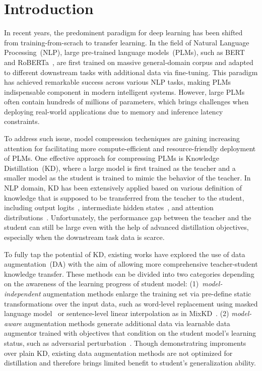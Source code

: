 \section{Introduction}

In recent years, the predominent paradigm for deep learning has been shifted from training-from-scrach to transfer learning. In the field of Natural Language Processing~(NLP), large pre-trained language models~(PLMs), such as BERT~\cite{bert} and RoBERTa~\cite{roberta}, are first trained on massive general-domain corpus and adapted to different downstream tasks with additional data via fine-tuning. This paradigm has achieved remarkable success across various NLP tasks, making PLMs indispensable component in modern intelligent systems. However, large PLMs often contain hundreds of millions of parameters, which brings challenges when deploying real-world applications due to memory and inference latency constraints.

To address such issue, model compression techeniques are gaining increasing attention for facilitating more compute-efficient and resource-friendly deployment of PLMs. One effective approach for compressing PLMs is Knowledge Distillation~(KD), where a large model is first trained as the teacher and a smaller model as the student is trained to mimic the behavior of the teacher. In NLP domain, KD has been extensively applied based on various definition of knowledge that is supposed to be transferred from the teacher to the student, including output logits~\cite{kd}, intermediate hidden states~\cite{distilbert,minilm}, and attention distributions~\cite{tinybert,mobilebert}. Unfortunately, the performance gap between the teacher and the student can still be large even with the help of advanced distillation objectives, especially when the downstream task data is scarce. 

To fully tap the potential of KD, existing works have explored the use of data augmentation~(DA) with the aim of allowing more 
comprehensive teacher-student knowledge transfer. These methods can be divided into two categories depending on the awareness of the learning progress of student model: (1)~\textit{model-independent} augmentation methods enlarge the training set via pre-define static transformations over the input data, such as word-level replacement using masked language model~\cite{bert} or sentence-level linear interpolation as in MixKD~\cite{mixkd}. 
(2) \textit{model-aware} augmentation methods generate additional data via learnable data augmentor trained with objectives that condition on the student model's learning status, such as adversarial perturbation~\cite{matekd,ad}.
Though demonstratring improments over plain KD, existing data augmentation methods are not optimized for distillation and therefore brings limited benefit to student's generalization ability.

